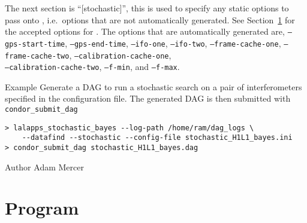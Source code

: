\begin{entry}
The next section is ``[stochastic]'', this is used to specify any static
options to pass onto , i.e.~options that are
not automatically generated. See
Section~\ref{program:lalapps-stochastic} for the accepted options for
. The options that are automatically generated
are, \texttt{--gps-start-time}, \texttt{--gps-end-time},
\texttt{--ifo-one}, \texttt{--ifo-two}, \texttt{--frame-cache-one},
\texttt{--frame-cache-two}, \texttt{--calibration-cache-one},\\
\texttt{--calibration-cache-two}, \texttt{--f-min}, and
\texttt{--f-max}.

\item[Example]
Generate a DAG to run a stochastic search on a pair of interferometers
specified in the configuration file. The generated DAG is then submitted
with \texttt{condor\_submit\_dag}

\begin{verbatim}
> lalapps_stochastic_bayes --log-path /home/ram/dag_logs \
    --datafind --stochastic --config-file stochastic_H1L1_bayes.ini
> condor_submit_dag stochastic_H1L1_bayes.dag
\end{verbatim}

\item[Author]
Adam Mercer
\end{entry}

\clearpage
\section{Program }
\label{program:lalapps-stochastic}

